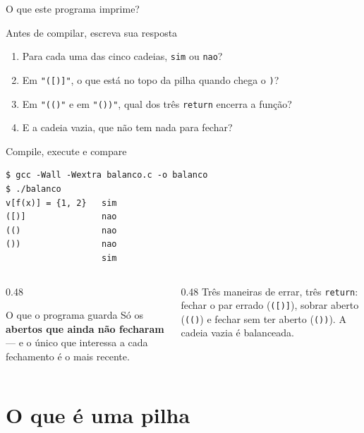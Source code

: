 \documentclass[aspectratio=169]{beamer}
\begin{document}
\begin{frame}{O que este programa imprime?}
  \begin{block}{Antes de compilar, escreva sua resposta}
    \begin{enumerate}
      \item Para cada uma das cinco cadeias, \texttt{sim} ou \texttt{nao}?
      \item Em \texttt{"([)]"}, o que está no topo da pilha quando chega o
        \texttt{)}?
      \item Em \texttt{"(()"} e em \texttt{"())"}, qual dos três
        \texttt{return} encerra a função?
      \item E a cadeia vazia, que não tem nada para fechar?
    \end{enumerate}
  \end{block}
\end{frame}

\begin{frame}[fragile]{Compile, execute e compare}
\begin{lstlisting}[style=shellStyle]
$ gcc -Wall -Wextra balanco.c -o balanco
$ ./balanco
v[f(x)] = {1, 2}   sim
([)]               nao
(()                nao
())                nao
                   sim
\end{lstlisting}
  \begin{columns}[T]
    \begin{column}{0.48\textwidth}
      \begin{block}{O que o programa guarda}
        \small Só os \textbf{abertos que ainda não fecharam} --- e o único
        que interessa a cada fechamento é o mais recente.
      \end{block}
    \end{column}
    \begin{column}{0.48\textwidth}
      \small Três maneiras de errar, três \texttt{return}: fechar o par
      errado (\texttt{([)]}), sobrar aberto (\texttt{(()}) e fechar sem ter
      aberto (\texttt{())}). A cadeia vazia é balanceada.
    \end{column}
  \end{columns}
\end{frame}

\section{O que é uma pilha}
\end{document}
